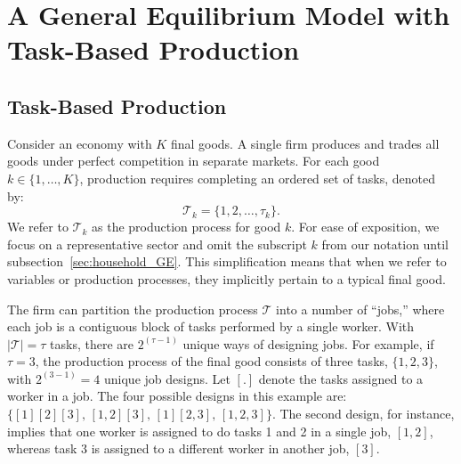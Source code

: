 \documentclass{article}
\theoremstyle{plain}
\theoremstyle{plain}
\begin{document}



\section{A General Equilibrium Model with Task-Based Production}
\label{sec:taskbased_GE}

\subsection{Task-Based Production}
Consider an economy with $K$ final goods.
A single firm produces and trades all goods under perfect competition in separate markets.
For each good $k \in \{1,\ldots,K\}$, production requires completing an ordered set of tasks, denoted by:
\[
\mathcal{T}_k = \{1,2,\ldots,\tau_k\}.
\]
We refer to $\mathcal{T}_k$ as the production process for good $k$.
For ease of exposition, we focus on a representative sector and omit the subscript $k$ from our notation until subsection~\ref{sec:household_GE}.
This simplification means that when we refer to variables or production processes, they implicitly pertain to a typical final good.

The firm can partition the production process $\mathcal{T}$ into a number of ``jobs,'' where each job is a contiguous block of tasks performed by a single worker.
With $|\mathcal{T}| = \tau$ tasks, there are $2^{(\tau - 1)}$ unique ways of designing jobs.
For example, if $\tau = 3$, the production process of the final good consists of three tasks, $\{1,2,3\}$, with $2^{(3-1)}=4$ unique job designs.
Let $[.]$ denote the tasks assigned to a worker in a job.
The four possible designs in this example are: $\{[1][2][3], \, [1,2][3], \, [1][2,3], \, [1,2,3]\}$.
The second design, for instance, implies that one worker is assigned to do tasks 1 and 2 in a single job, $[1,2]$, whereas task 3 is assigned to a different worker in another job, $[3]$.
\end{document}

